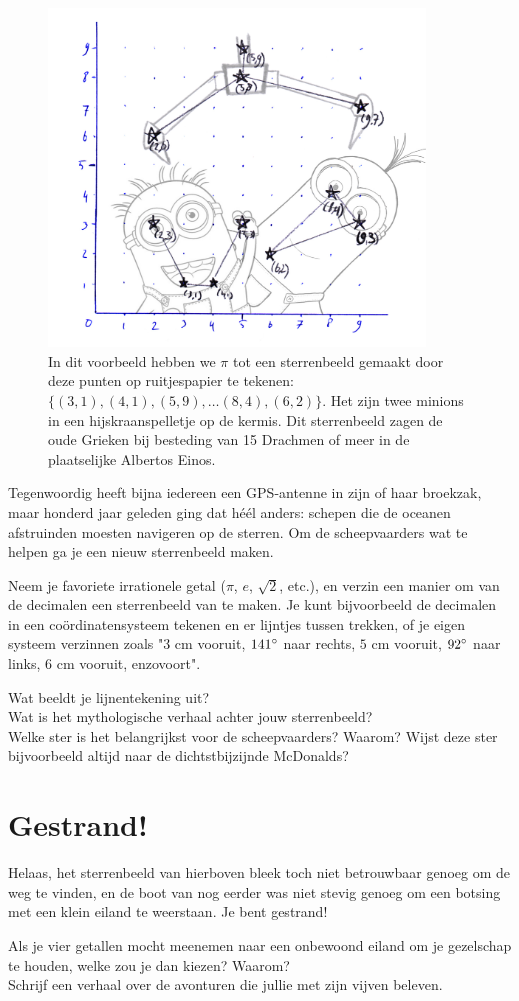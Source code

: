 \documentclass{weekprobleem}
\newcommand{\textgreek}[1]{\begingroup\fontencoding{LGR}\selectfont#1\endgroup}
\begin{document}
\begin{figure}
	\centering
	\includegraphics[width=10cm]{pi}
	\caption{\small{In dit voorbeeld hebben we $\pi$ tot een sterrenbeeld gemaakt door deze punten op ruitjespapier te tekenen: $\{(3,1), (4,1), (5,9), \ldots (8,4), (6,2)\}$. Het zijn twee minions in een hijskraanspelletje op de kermis. Dit sterrenbeeld zagen de oude Grieken bij besteding van 15 Drachmen of meer in de plaatselijke \textgreek{Albertos \<Einos}.}}
\end{figure}
Tegenwoordig heeft bijna iedereen een GPS-antenne in zijn of haar broekzak, maar honderd jaar geleden ging dat héél anders: schepen die de oceanen afstruinden moesten navigeren op de sterren.
Om de scheepvaarders wat te helpen ga je een nieuw sterrenbeeld maken.

Neem je favoriete irrationele getal ($\pi$, $e$, $\sqrt{2}$, etc.), en verzin een manier om van de decimalen een sterrenbeeld van te maken.
Je kunt bijvoorbeeld de decimalen in een coördinatensysteem tekenen en er lijntjes tussen trekken, of je eigen systeem verzinnen zoals "$3$ cm vooruit, $141{\degree}$ naar rechts, $5$ cm vooruit, $92{\degree}$ naar links, $6$ cm vooruit, enzovoort".

Wat beeldt je lijnentekening uit?\\
Wat is het mythologische verhaal achter jouw sterrenbeeld?\\
Welke ster is het belangrijkst voor de scheepvaarders? Waarom? Wijst deze ster bijvoorbeeld altijd naar de dichtstbijzijnde McDonalds?


\section*{Gestrand!}

Helaas, het sterrenbeeld van hierboven bleek toch niet betrouwbaar genoeg om de weg te vinden, en de boot van nog eerder was niet stevig genoeg om een botsing met een klein eiland te weerstaan. Je bent gestrand!

Als je vier getallen mocht meenemen naar een onbewoond eiland om je gezelschap te houden, welke zou je dan kiezen? Waarom?\\
Schrijf een verhaal over de avonturen die jullie met zijn vijven beleven.
\end{document}
